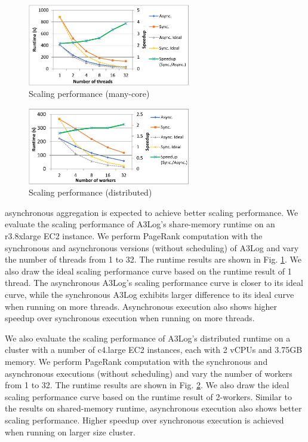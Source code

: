  \begin{figure}[!t]
 	\centering
 	\includegraphics[width=2.8in]{fig/single-scalability}
 	\vspace{-0.1in}
 	\caption{Scaling performance (many-core)}
 	\label{fig:single-scalability}
 \end{figure}
 
 \begin{figure}[!t]
 	\centering
 	\includegraphics[width=2.8in]{fig/dist-scalability}
 	\vspace{-0.1in}
 	\caption{Scaling performance (distributed)}
 	\label{fig:dist-scalability}
 \end{figure}
 
 
asynchronous aggregation is expected to achieve better scaling performance. We evaluate the scaling performance of A3Log's share-memory runtime on an r3.8xlarge EC2 instance. We perform PageRank computation with the synchronous and asynchronous versions (without scheduling) of A3Log and vary the number of threads from 1 to 32. The runtime results are shown in Fig. \ref{fig:single-scalability}. We also draw the ideal scaling performance curve based on the runtime result of 1 thread. The asynchronous A3Log's scaling performance curve is closer to its ideal curve, while the synchronous A3Log exhibits larger difference to its ideal curve when running on more threads. Asynchronous execution also shows higher speedup over synchronous execution when running on more threads.
 
 We also evaluate the scaling performance of A3Log's distributed runtime on a cluster with a number of c4.large EC2 instances, each with 2 vCPUs and 3.75GB memory. We perform PageRank computation with the synchronous and asynchronous executions (without scheduling) and vary the number of workers from 1 to 32. The runtime results are shown in Fig. \ref{fig:dist-scalability}. We also draw the ideal scaling performance curve based on the runtime result of 2-workers. Similar to the results on shared-memory runtime, asynchronous execution also shows better scaling performance. Higher speedup over synchronous execution is achieved when running on larger size cluster.


